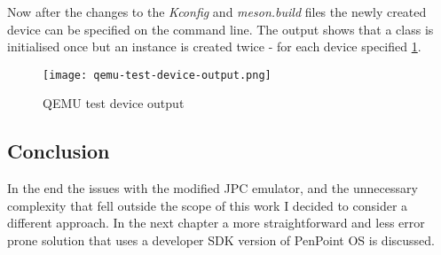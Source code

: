 \begin{codeblock}
    
\end{codeblock}

\noindent
Now after the changes to the \emph{Kconfig} and \emph{meson.build} files the
newly created device can be specified on the command line. The output shows
that a class is initialised  once but an instance is created twice - for each
device specified \ref{fig:qemu-test-device-output}.

\begin{figure}[H]
    \centering
    \texttt{[image: qemu-test-device-output.png]}
    \caption{QEMU test device output}
    \label{fig:qemu-test-device-output}
\end{figure}

\subsection{Conclusion}


In the end the issues with the modified JPC emulator, and the unnecessary
complexity that fell outside the scope of this work I decided to consider
a different approach.  In the next chapter a more straightforward and less error
prone solution that uses a developer SDK version of PenPoint OS is discussed.

